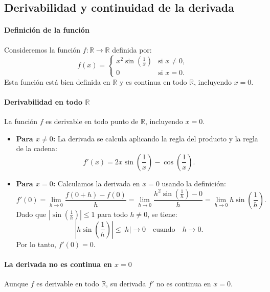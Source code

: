 \documentclass[12pt, a4paper]{article}
\theoremstyle{rioplatense}
\begin{document}
\subsection{Derivabilidad y continuidad de la derivada}

\paragraph{Definición de la función}
Consideremos la función \( f: \mathbb{R} \to \mathbb{R} \) definida por:
\[
f(x) =
\begin{cases}
x^2 \sin\left(\frac{1}{x}\right) & \text{si } x \neq 0, \\
0 & \text{si } x = 0.
\end{cases}
\]
Esta función está bien definida en \( \mathbb{R} \) y es continua en todo \( \mathbb{R} \), incluyendo \( x = 0 \).

\paragraph{Derivabilidad en todo \( \mathbb{R} \)}
La función \( f \) es derivable en todo punto de \( \mathbb{R} \), incluyendo \( x = 0 \).
\begin{itemize}
    \item \textbf{Para \( x \neq 0 \):}
    La derivada se calcula aplicando la regla del producto y la regla de la cadena:
    \[
    f'(x) = 2x \sin\left(\frac{1}{x}\right) - \cos\left(\frac{1}{x}\right).
    \]

    \item \textbf{Para \( x = 0 \):}
    Calculamos la derivada en \( x = 0 \) usando la definición:
    \[
    f'(0) = \lim_{h \to 0} \frac{f(0 + h) - f(0)}{h} = \lim_{h \to 0} \frac{h^2 \sin\left(\frac{1}{h}\right) - 0}{h} = \lim_{h \to 0} h \sin\left(\frac{1}{h}\right).
    \]
    Dado que \( \left| \sin\left(\frac{1}{h}\right) \right| \leq 1 \) para todo \( h \neq 0 \), se tiene:
    \[
    \left| h \sin\left(\frac{1}{h}\right) \right| \leq |h| \to 0 \quad \text{cuando} \quad h \to 0.
    \]
    Por lo tanto, \( f'(0) = 0 \).
\end{itemize}

\paragraph{La derivada no es continua en \( x = 0 \)}
Aunque \( f \) es derivable en todo \( \mathbb{R} \), su derivada \( f' \) no es continua en \( x = 0 \).
\end{document}
